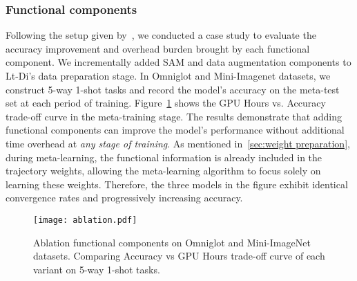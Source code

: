 \begin{table}[t]
\centering
{}
\caption{Ablation main components on Omniglot and Mini-Imagenet datasets. Evaluate the accuracy of each variant on 5-way 1-shot tasks.}
\label{tab:ablation_main}
\end{table}

\subsubsection{Functional components}\label{sec:ablation_functional}
Following the setup given by~\citet{MAML}, we conducted a case study to evaluate the accuracy improvement and overhead burden brought by each functional component. We incrementally added SAM and data augmentation components to Lt-Di's data preparation stage. In Omniglot and Mini-Imagenet datasets, we construct 5-way 1-shot tasks and record the model's accuracy on the meta-test set at each period of training. Figure~\ref{fig:components_ablation} shows the GPU Hours vs. Accuracy trade-off curve in the meta-training stage. The results demonstrate that adding functional components can improve the model's performance without additional time overhead at \textit{any stage of training}. As mentioned in~\ref{sec:weight preparation}, during meta-learning, the functional information is already included in the trajectory weights, allowing the meta-learning algorithm to focus solely on learning these weights. Therefore, the three models in the figure exhibit identical convergence rates and progressively increasing accuracy.

\begin{figure}
    \centering
    \texttt{[image: ablation.pdf]}
    \caption{Ablation functional components on Omniglot and Mini-ImageNet datasets. Comparing Accuracy vs GPU Hours trade-off curve of each variant on 5-way 1-shot tasks.}
    \label{fig:components_ablation}
\end{figure}

